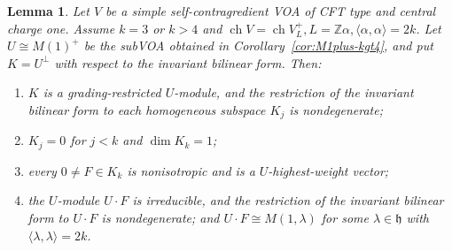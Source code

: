 \documentclass[12pt,leqno]{amsart}
\numberwithin{equation}{section} \newtheorem{thm}{Theorem}[section] \newtheorem{lem}[thm]{Lemma} \newtheorem{ex}[thm]{Example} \newtheorem{prop}[thm]{Proposition} \newtheorem{cor}[thm]{Corollary} \newtheorem{defi}[thm]{Definition} \newtheorem{rmk}[thm]{Remark} \newtheorem{notation}[thm]{Notation}
\newcommand{\ch}{\operatorname{ch}}
\def\Z{\mathbb{Z}} \def\N{\mathbb{N}} \def\A{\mathbb{A}} \def\C{\mathbb{C}} \def\R{\mathbb{R}} \def\Q{\mathbb{Q}} \def\F{\mathbb{F}}
\begin{document}
\begin{lem}\label{lem:first-lattice}
Let $V$ be a simple self-contragredient VOA of CFT type and central charge one. Assume $k=3$ or $k>4$ and \(\ch V=\ch V_L^+, L=\Z\alpha,\langle\alpha,\alpha\rangle=2k\). Let \(U\cong M(1)^+\) be the subVOA obtained in Corollary~\ref{cor:M1plus-kgt4}, and put $K=U^\perp$ with respect to the invariant bilinear form. Then:
\begin{enumerate}[label=(\roman*),leftmargin=2.1em]
\item $K$ is a grading-restricted $U$-module, and the restriction of the invariant bilinear form to each homogeneous subspace $K_j$ is nondegenerate;
\item $K_j=0$ for $j<k$ and $\dim K_k=1$;
\item every $0\ne F\in K_k$ is nonisotropic and is a $U$-highest-weight vector;
\item the $U$-module $U\cdot F$ is irreducible, and the restriction of the
invariant bilinear form to $U\cdot F$ is nondegenerate; and \(U\cdot F\cong M(1,\lambda)\) for some $\lambda\in\mathfrak h$ with \(\langle\lambda,\lambda\rangle=2k\).
\end{enumerate}
\end{lem}
\end{document}

